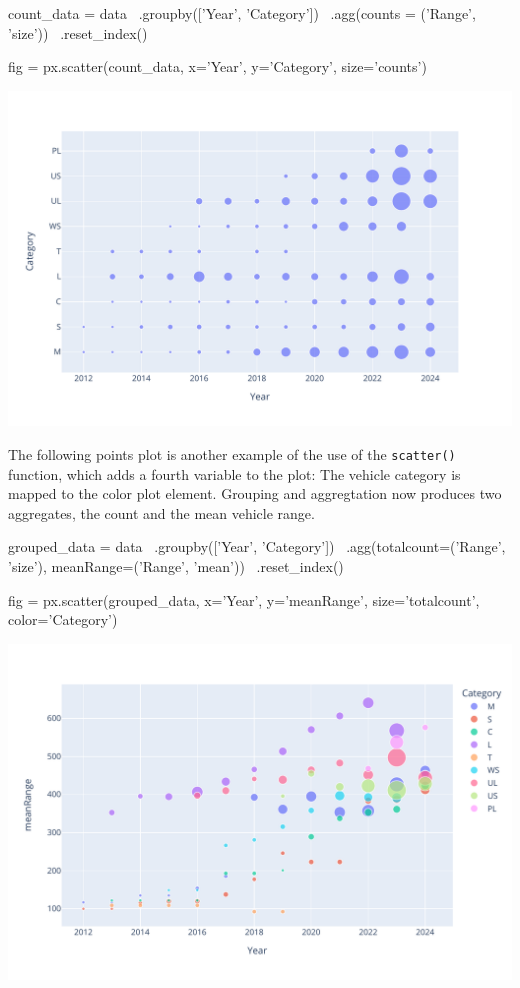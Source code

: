 \begin{pythoncode}
count_data = data \
   .groupby(['Year', 'Category']) \
   .agg(counts = ('Range', 'size')) \
   .reset_index()

fig = px.scatter(count_data, x='Year', y='Category', size='counts')
\end{pythoncode}

\begin{center}
  \includegraphics[width=.8\textwidth]{px.fuel.count.pdf}
\end{center}

The following points plot \index{Plot!Points} is another example of the use of the \texttt{scatter()} function, which adds a fourth variable to the plot: The vehicle category is mapped to the color plot element. Grouping and aggregtation now produces two aggregates, the count and the mean vehicle range.  

\begin{pythoncode}
grouped_data = data \
    .groupby(['Year', 'Category']) \
    .agg(totalcount=('Range', 'size'),
         meanRange=('Range', 'mean')) \
    .reset_index()
    
fig = px.scatter(grouped_data, 
           x='Year', y='meanRange', 
           size='totalcount', color='Category')
\end{pythoncode}

\begin{center}
  \includegraphics[width=.8\textwidth]{px.fuel.pointsSize.pdf}
\end{center}

